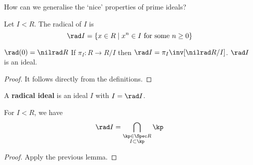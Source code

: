 How can we generalise the `nice' properties of prime ideals?

\begin{defn}[0.13]
	Let $I<R$.
	The radical of $I$ is
	\[\rad I = \{x \in R \mid x^n \in I \text{ for some } n \geq 0\}\]
\end{defn}

\begin{lem}[0.14]
	\begin{enum}
		\io $\rad (0) = \nilrad R$
		\io If $\pi_I: R \to R/I$ then $\rad I = \pi_I\inv[\nilrad R/I]$.
		\io $\rad I$ is an ideal.
	\end{enum}
\end{lem}

\begin{proof}
	It follows directly from the definitions.
\end{proof}

\begin{defn}[0.15]
	A \textbf{radical ideal} is an ideal $I$ with $I = \rad I$.
\end{defn}

\begin{lem}[0.16]
	For $I<R$, we have
	\[\rad I = \bigcap_{\substack{\kp \in \Spec R \\ I \subset \kp}} \kp\]
\end{lem}

\begin{proof}
	Apply the previous lemma.
\end{proof}